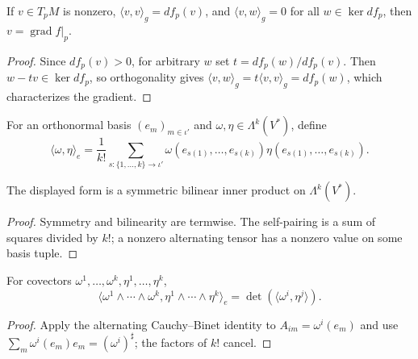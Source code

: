 \begin{lemma}
\label{lem:transversal-representative-eq-gradient}





If $v\in T_pM$ is nonzero, $\langle v,v\rangle_g=df_p(v)$, and $\langle v,w\rangle_g=0$ for all $w\in\ker df_p$, then $v=\operatorname{grad}f|_p$.
\end{lemma}

\begin{proof}

\sketch Since $df_p(v)>0$, for arbitrary $w$ set $t=df_p(w)/df_p(v)$. Then $w-tv\in\ker df_p$, so orthogonality gives $\langle v,w\rangle_g=t\langle v,v\rangle_g=df_p(w)$, which characterizes the gradient.
\end{proof}

\begin{definition}
\label{def:inner-k-covectors}




For an orthonormal basis $(e_m)_{m\in\iota'}$ and $\omega,\eta\in\Lambda^k(V^*)$, define
\[
\langle\omega,\eta\rangle_e=\frac1{k!}\sum_{s:\{1,\ldots,k\}\to\iota'}\omega(e_{s(1)},\ldots,e_{s(k)})\eta(e_{s(1)},\ldots,e_{s(k)}).
\]
\end{definition}

\begin{lemma}
\label{lem:inner-k-covectors-posdef}





The displayed form is a symmetric bilinear inner product on $\Lambda^k(V^*)$.
\end{lemma}
\begin{proof}

\sketch Symmetry and bilinearity are termwise. The self-pairing is a sum of squares divided by $k!$; a nonzero alternating tensor has a nonzero value on some basis tuple.
\end{proof}

\begin{lemma}
\label{lem:inner-k-covectors-wedge}





For covectors $\omega^1,\ldots,\omega^k,\eta^1,\ldots,\eta^k$,
\[
\langle\omega^1\wedge\cdots\wedge\omega^k,\eta^1\wedge\cdots\wedge\eta^k\rangle_e=\det(\langle\omega^i,\eta^j\rangle).
\]
\end{lemma}
\begin{proof}

\sketch Apply the alternating Cauchy--Binet identity to $A_{im}=\omega^i(e_m)$ and use $\sum_m\omega^i(e_m)e_m=(\omega^i)^\sharp$; the factors of $k!$ cancel.
\end{proof}

